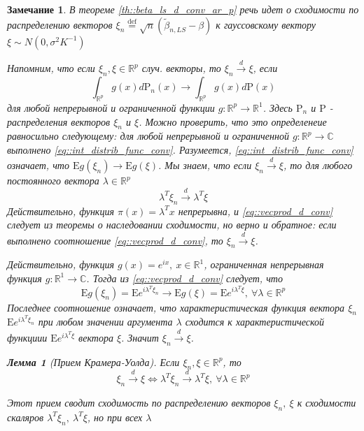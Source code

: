 \documentclass[12pt]{article}
\newtheorem{lemma}{Лемма}
\newtheorem{remark}{Замечание}
\newcommand*{\defeq}{\stackrel{\text{def}}{=}}
\def\R{ \mathbb{R} }
\def\C{ \mathbb{C} }
\def\E{ \mathrm{E} }
\def\P{ \mathrm{P} }
\begin{document}
\begin{remark}
    В теореме \ref{th::beta_ls_d_conv_ar_p} речь идет о сходимости по распределению векторов
    $\xi_n\defeq \sqrt{n}(\widetilde{\beta}_{n,LS}-\beta)$ к гауссовскому вектору $\xi\sim N(0,\sigma^2K^{-1})$

    Напомним, что если $\xi_n,\xi\in\R^p$ случ. векторы, то $\xi_n\xrightarrow{d}\xi$, если
    \begin{equation} \label{eq::int_distrib_func_conv}
        \int_{\R^p}g(x)d\P_n(x)\rightarrow\int_{\R^p}g(x)d\P(x)
    \end{equation}
    для любой непрерывной и ограниченной функции $g:\R^p\rightarrow\R^1$. Здесь $\P_n$ и $\P$ - 
    распределения векторов $\xi_n$ и $\xi$. Можно проверить, что это определенеие равносильно
    следующему: для любой непрерывной и ограниченной $g:\R^p\rightarrow\C$ выполнено \eqref{eq::int_distrib_func_conv}.
    Разумеется, \eqref{eq::int_distrib_func_conv} означает, что $\E g(\xi_n)\rightarrow\E g(\xi)$.
    Мы знаем, что если $\xi_n\xrightarrow{d}\xi$, то для любого постоянного вектора $\lambda\in\R^p$
    \begin{equation}\label{eq::vecprod_d_conv}
        \lambda^T\xi_n\xrightarrow{d}\lambda^T\xi
    \end{equation}
    Действительно, функция $\pi(x)=\lambda^Tx$ непрерывна, и \eqref{eq::vecprod_d_conv} следует из теоремы о наследовании
    сходимости, но верно и обратное: если выполнено соотношение \eqref{eq::vecprod_d_conv}, то $\xi_n\xrightarrow{d}\xi$.

    Действительно, функция $g(x)=e^{ix},\ x\in\R^1$, ограниченная непрерывная функция $g:\R^1\rightarrow\C$.
    Тогда из \eqref{eq::vecprod_d_conv} следует, что
    \[\E g(\xi_n)=\E e^{i\lambda^T\xi_n}\rightarrow\E g(\xi)=\E e^{i\lambda^T\xi},\ \forall\lambda\in\R^p\]
    Последнее соотношение означает, что характеристическая функция вектора $\xi_n$ $\E e^{i\lambda^T\xi_n}$
    при любом значении аргумента $\lambda$ сходится к характеристической функциии $\E e^{i\lambda^T\xi}$ вектора $\xi$.
    Значит $\xi_n\xrightarrow{d}\xi$.
    \begin{lemma}[Прием Крамера-Уолда]\label{lm::cramer_wold}
        Если $\xi_n,\xi\in\R^p$, то
        \[\xi_n\xrightarrow{d}\xi\Leftrightarrow\lambda^T\xi_n\xrightarrow{d}\lambda^T\xi,\ \forall\lambda\in\R^p\]
    \end{lemma}
    \begin{leftbar}
        Этот прием сводит сходимость по распределению векторов $\xi_n,\ \xi$ к сходимости скаляров $\lambda^T\xi_n,\ \lambda^T\xi$, но при
        всех $\lambda$
    \end{leftbar}
\end{remark}
\end{document}
